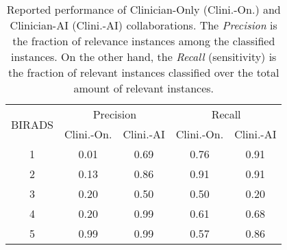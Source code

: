 \begin{table}[htbp]
\centering
\begin{tabular}{|c|c|c|c|c|}
\hline
\multirow{2}{*}{BIRADS} & \multicolumn{2}{c|}{Precision} & \multicolumn{2}{c|}{Recall}   \\ \cline{2-5} 
                        & Clini.-On.      & Clini.-AI    & Clini.-On.     & Clini.-AI    \\ \hline
1                       & 0.01            & 0.69         & 0.76           & 0.91         \\ \hline
2                       & 0.13            & 0.86         & 0.91           & 0.91         \\ \hline
3                       & 0.20            & 0.50         & 0.50           & 0.20         \\ \hline
4                       & 0.20            & 0.99         & 0.61           & 0.68         \\ \hline
5                       & 0.99            & 0.99         & 0.57           & 0.86         \\ \hline
\end{tabular}
\caption{Reported performance of Clinician-Only (Clini.-On.) and Clinician-AI (Clini.-AI) collaborations. The {\it Precision} is the fraction of relevance instances among the classified instances. On the other hand, the {\it Recall} (sensitivity) is the fraction of relevant instances classified over the total amount of relevant instances.}
\label{tab:tab005}
\end{table}